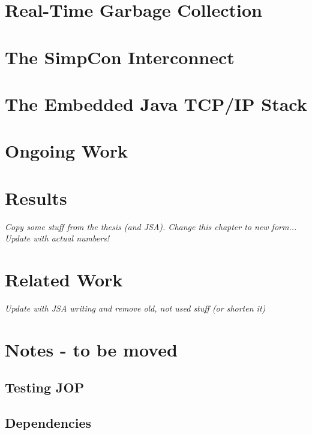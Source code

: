 \chapter{Real-Time Garbage Collection}
\label{chap:rtgc}
    

\chapter{The SimpCon Interconnect}
\label{chap:simpcon}
\newcommand{\scgrsc}{.65}
\newcommand{\scgrp}{simpcon}



\chapter{The Embedded Java TCP/IP Stack}
\label{chap:ejip}
\newcommand{\grpath}{ejip}


\chapter{Ongoing Work}
\label{chap:ongoing}
    

\chapter{Results}
\emph{Copy some stuff from the thesis (and JSA). Change this chapter
to new form... Update with actual numbers!}

\label{chap:results}
    

\chapter{Related Work}
\label{chap:related}

\emph{Update with JSA writing and remove old, not used stuff (or
shorten it)}
    


\chapter{Notes - to be moved}

\section{Testing JOP}



\section{Dependencies}

